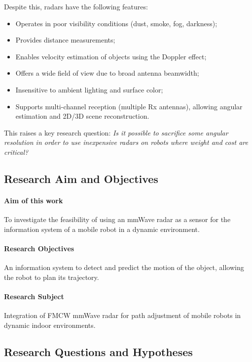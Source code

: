 \noindent
Despite this, radars have the following features:
\begin{itemize}
    \item Operates in poor visibility conditions (dust, smoke, fog, darkness);
    \item Provides distance measurements;
    \item Enables velocity estimation of objects using the Doppler effect;
    \item Offers a wide field of view due to broad antenna beamwidth;
    \item Insensitive to ambient lighting and surface color;
    \item Supports multi-channel reception (multiple Rx antennas), allowing angular estimation and 2D/3D scene reconstruction.
\end{itemize}

This raises a key research question: \emph{Is it possible to sacrifice some angular resolution in order to use inexpensive radars on robots where weight and cost are critical?}



    
\subsection{Research Aim and Objectives}

\paragraph{Aim of this work} To investigate the feasibility of using an mmWave radar as a sensor for the information system of a mobile robot in a dynamic environment.

\paragraph{Research Objectives} An information system to detect and predict the motion of the object, allowing the robot to plan its trajectory.

\paragraph{Research Subject}
Integration of FMCW mmWave radar for path adjustment of mobile robots in dynamic indoor environments.



\subsection{Research Questions and Hypotheses}

